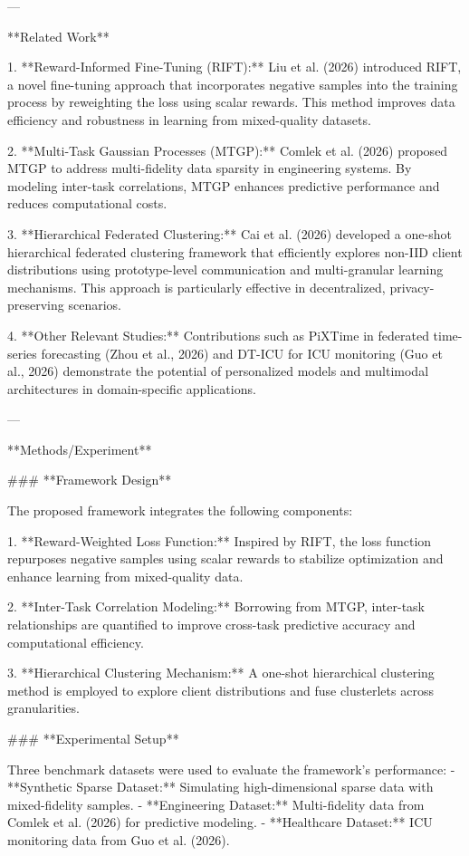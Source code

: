 ---

**Related Work**

1. **Reward-Informed Fine-Tuning (RIFT):** Liu et al. (2026) introduced RIFT, a novel fine-tuning approach that incorporates negative samples into the training process by reweighting the loss using scalar rewards. This method improves data efficiency and robustness in learning from mixed-quality datasets.

2. **Multi-Task Gaussian Processes (MTGP):** Comlek et al. (2026) proposed MTGP to address multi-fidelity data sparsity in engineering systems. By modeling inter-task correlations, MTGP enhances predictive performance and reduces computational costs.

3. **Hierarchical Federated Clustering:** Cai et al. (2026) developed a one-shot hierarchical federated clustering framework that efficiently explores non-IID client distributions using prototype-level communication and multi-granular learning mechanisms. This approach is particularly effective in decentralized, privacy-preserving scenarios.

4. **Other Relevant Studies:** Contributions such as PiXTime in federated time-series forecasting (Zhou et al., 2026) and DT-ICU for ICU monitoring (Guo et al., 2026) demonstrate the potential of personalized models and multimodal architectures in domain-specific applications.

---

**Methods/Experiment**

### **Framework Design**

The proposed framework integrates the following components:

1. **Reward-Weighted Loss Function:** Inspired by RIFT, the loss function repurposes negative samples using scalar rewards to stabilize optimization and enhance learning from mixed-quality data.
   
2. **Inter-Task Correlation Modeling:** Borrowing from MTGP, inter-task relationships are quantified to improve cross-task predictive accuracy and computational efficiency.

3. **Hierarchical Clustering Mechanism:** A one-shot hierarchical clustering method is employed to explore client distributions and fuse clusterlets across granularities.

### **Experimental Setup**

Three benchmark datasets were used to evaluate the framework's performance:
- **Synthetic Sparse Dataset:** Simulating high-dimensional sparse data with mixed-fidelity samples.
- **Engineering Dataset:** Multi-fidelity data from Comlek et al. (2026) for predictive modeling.
- **Healthcare Dataset:** ICU monitoring data from Guo et al. (2026).

